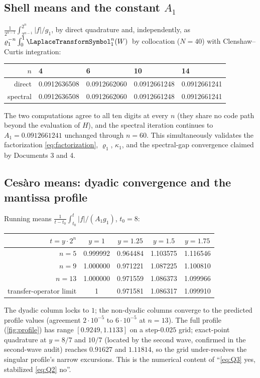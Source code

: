 \documentclass[11pt,oneside]{article}
\theoremstyle{definition}
\theoremstyle{remark}
\begin{document}
\subsection{Shell means and the constant $A_1$}
\label{ssec:shells}

$\frac{1}{2^{n-1}}\int_{2^{n-1}}^{2^n}|f|/g_1$, by direct quadrature and,
independently, as $\varrho_1^{-n}\int_0^1\LaplaceTransformSymbol_1^n(W)\,$ by collocation
($N=40$) with Clenshaw--Curtis integration:
\begin{center}
\small
\begin{tabular}{@{}rllll@{}}
\toprule
$n$ & 4 & 6 & 10 & 14 \\
\midrule
direct   & 0.0912636508 & 0.0912662060 & 0.0912661248 & 0.0912661241\\
spectral & 0.0912636508 & 0.0912662060 & 0.0912661248 & 0.0912661241\\
\bottomrule
\end{tabular}
\end{center}
The two computations agree to all ten digits at every $n$ (they share no
code path beyond the evaluation of $H$), and the spectral iteration
continues to $A_1=0.0912661241$ unchanged through $n=60$.  This
simultaneously validates the factorization \eqref{eq:factorization},
$\varrho_1$, $\kappa_1$, and the spectral-gap convergence claimed by
Documents 3 and 4.

\subsection{Ces\`aro means: dyadic convergence and the mantissa profile}
\label{ssec:cesaro}

Running means $\frac{1}{t-t_0}\int_{t_0}^{t}|f|/(A_1g_1)$, $t_0=8$:
\begin{center}
\small
\begin{tabular}{@{}rcccc@{}}
\toprule
$t=y\cdot2^n$ & $y=1$ & $y=1.25$ & $y=1.5$ & $y=1.75$\\
\midrule
$n=5$  & 0.999992 & 0.964484 & 1.103575 & 1.116546\\
$n=9$  & 1.000000 & 0.971221 & 1.087225 & 1.100810\\
$n=13$ & 1.000000 & 0.971559 & 1.086373 & 1.099966\\
transfer-operator limit & 1 & 0.971581 & 1.086317 & 1.099910\\
\bottomrule
\end{tabular}
\end{center}
The dyadic column locks to $1$; the non-dyadic columns converge to the
predicted profile values (agreement $2\cdot10^{-5}$ to $6\cdot10^{-5}$ at
$n=13$).  The full profile (\cref{fig:profile}) has range
$[0.9249,1.1133]$ on a step-$0.025$ grid; exact-point quadrature at
$y=8/7$ and $10/7$ (located by the second wave, confirmed in the
second-wave audit) reaches $0.91627$ and $1.11814$, so the grid
under-resolves the singular profile's narrow excursions.  This is the
numerical content of ``\eqref{eq:Q3} yes, stabilized \eqref{eq:Q2}
no''.
\end{document}
